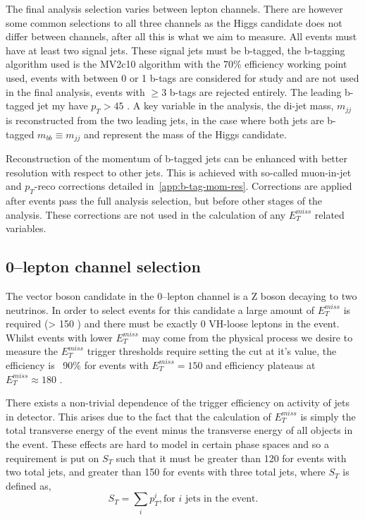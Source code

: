 The final analysis selection varies between lepton channels. There are however
some common selections to all three channels as the Higgs candidate does not
differ between channels, after all this is what we aim to measure. All events must
have at least two signal jets. These signal jets must be b-tagged, the b-tagging
algorithm used is the MV2c10 algorithm with the 70\% efficiency working point
used, events with between 0 or 1 b-tags are considered for study and are not
used in the final analysis, events with $\ge3$ b-tags are rejected entirely. The
leading b-tagged jet my have $p_T > 45$ \GeV. A key variable in the analysis, the
di-jet mass, $m_{jj}$ is reconstructed from the two leading jets, in the case
where both jets are b-tagged $m_{bb} \equiv m_{jj}$ and represent the mass of
the Higgs candidate.

Reconstruction of the momentum of b-tagged jets can be enhanced with better
resolution with respect to other jets. This is achieved with so-called
muon-in-jet and $p_T$-reco corrections detailed in~\ref{app:b-tag-mom-res}.
Corrections are applied after events pass the full analysis selection, but
before other stages of the analysis. These corrections are not used in the
calculation of any $E_T^{miss}$ related variables.

\subsection{0--lepton channel selection}
\label{sec:0lep-selection}

The vector boson candidate in the 0--lepton channel is a Z boson decaying to two
neutrinos. In order to select events for this candidate a large amount of
$E_T^{miss}$ is required (> 150 \GeV) and there must be exactly 0 VH-loose
leptons in the event. Whilst events with lower $E_T^{miss}$ may come from the
physical process we desire to measure the $E_T^{miss}$ trigger thresholds
require setting the cut at it's value, the efficiency is ~90\% for events
with $E_T^{miss} = 150$ \GeV and efficiency plateaus at $E_T^{miss} \approx 180$
\GeV.

There exists a non-trivial dependence of the trigger efficiency on activity of
jets in detector. This arises due to the fact that the calculation of
$E_T^{miss}$ is simply the total transverse energy of the event minus the
transverse energy of all objects in the event. These effects are hard to model
in certain phase spaces and so a requirement is put on $S_T$ such that it must
be greater than 120 \GeV for events with two total jets, and greater than 150 \GeV
for events with three total jets, where $S_T$ is defined as,
\begin{equation}
  S_T = \sum_i p_T^i, \text{for } i \text{ jets in the event.}
\end{equation}

